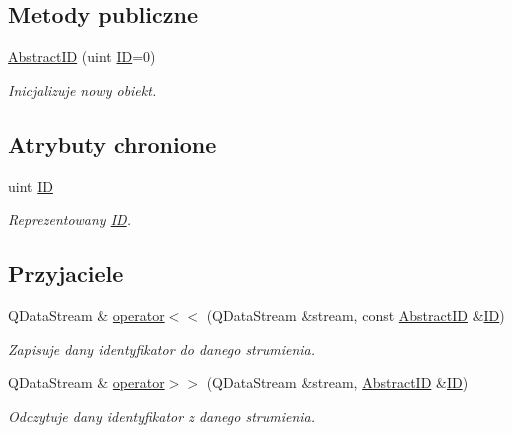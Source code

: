 \subsection*{Metody publiczne}
\begin{DoxyCompactItemize}
\item 
\hyperlink{classobsolete_1_1AbstractID_aff6a5e33261e36af0dcf9b38d99f0056}{AbstractID} (uint \hyperlink{classobsolete_1_1ID}{ID}=0)
\begin{DoxyCompactList}\small\item\em Inicjalizuje nowy obiekt. \item\end{DoxyCompactList}\end{DoxyCompactItemize}
\subsection*{Atrybuty chronione}
\begin{DoxyCompactItemize}
\item 
uint \hyperlink{classobsolete_1_1AbstractID_a5f67fa1c7d96085f0ef41193b60b570c}{ID}
\begin{DoxyCompactList}\small\item\em Reprezentowany \hyperlink{classobsolete_1_1ID}{ID}. \item\end{DoxyCompactList}\end{DoxyCompactItemize}
\subsection*{Przyjaciele}
\begin{DoxyCompactItemize}
\item 
QDataStream \& \hyperlink{classobsolete_1_1AbstractID_ae018346f525245975a90a561d3cffccd}{operator$<$$<$} (QDataStream \&stream, const \hyperlink{classobsolete_1_1AbstractID}{AbstractID} \&\hyperlink{classobsolete_1_1ID}{ID})
\begin{DoxyCompactList}\small\item\em Zapisuje dany identyfikator do danego strumienia. \item\end{DoxyCompactList}\item 
QDataStream \& \hyperlink{classobsolete_1_1AbstractID_ae2290b15582443d09db5f4963e546920}{operator$>$$>$} (QDataStream \&stream, \hyperlink{classobsolete_1_1AbstractID}{AbstractID} \&\hyperlink{classobsolete_1_1ID}{ID})
\begin{DoxyCompactList}\small\item\em Odczytuje dany identyfikator z danego strumienia. \item\end{DoxyCompactList}\end{DoxyCompactItemize}


